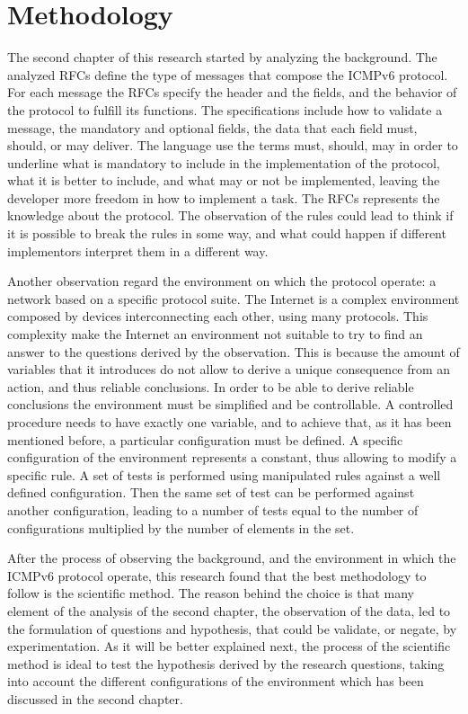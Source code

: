 \documentclass[12pt]{article}
\begin{document}
\pagebreak

\section{Methodology}
\label{sec:3}

The second chapter of this research started by analyzing the background. The analyzed RFCs define the type of messages that compose the ICMPv6 protocol. For each message the RFCs specify the header and the fields, and the behavior of the protocol to fulfill its functions. The specifications include how to validate a message, the mandatory and optional fields, the data that each field must, should, or may deliver. The language use the terms must, should, may in order to underline what is mandatory to include in the implementation of the protocol, what it is better to include, and what may or not be implemented, leaving the developer more freedom in how to implement a task. The RFCs represents the knowledge about the protocol. The observation of the rules could lead to think if it is possible to break the rules in some way, and what could happen if different implementors interpret them in a different way.

Another observation regard the environment on which the protocol operate: a network based on a specific protocol suite. The Internet is a complex environment composed by devices interconnecting each other, using many protocols. This complexity make the Internet an environment not suitable to try to find an answer to the questions derived by the observation. This is because the amount of variables that it introduces do not allow to derive a unique consequence from an action, and thus reliable conclusions. In order to be able to derive reliable conclusions the environment must be simplified and be controllable. A controlled procedure needs to have exactly one variable, and to achieve that, as it has been mentioned before, a particular configuration must be defined. A specific configuration of the environment represents a constant, thus allowing to modify a specific rule. A set of tests is performed using manipulated rules against a well defined configuration. Then the same set of test can be performed against another configuration, leading to a number of tests equal to the number of configurations multiplied by the number of elements in the set.\cite{secExperiments}

After the process of observing the background, and the environment in which the ICMPv6 protocol operate, this research found that the best methodology to follow is the scientific method. The reason behind the choice is that many element of the analysis of the second chapter, the observation of the data, led to the formulation of questions and hypothesis, that could be validate, or negate, by experimentation. As it will be better explained next, the process of the scientific method is ideal to test the hypothesis derived by the research questions, taking into account the different configurations of the environment which has been discussed in the second chapter.
\end{document}
